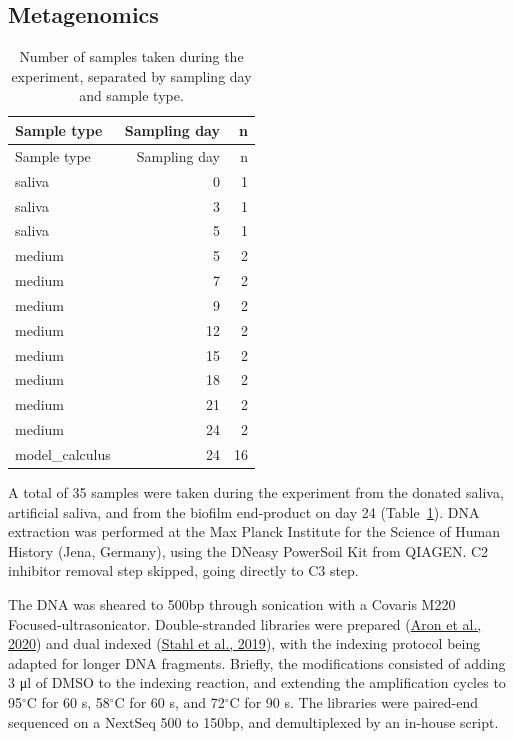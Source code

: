 \documentclass[
  letterpaper,
]{book}
\begin{document}
\hypertarget{metagenomics}{%
\subsection{Metagenomics}\label{metagenomics}}

\hypertarget{tbl-dna-samples}{}
\begin{longtable}[]{@{}lrr@{}}
\caption{\label{tbl-dna-samples}Number of samples taken during the
experiment, separated by sampling day and sample type.}\tabularnewline
\toprule\noalign{}
Sample type & Sampling day & n \\
\midrule\noalign{}
\endfirsthead
\toprule\noalign{}
Sample type & Sampling day & n \\
\midrule\noalign{}
\endhead
\bottomrule\noalign{}
\endlastfoot
saliva & 0 & 1 \\
saliva & 3 & 1 \\
saliva & 5 & 1 \\
medium & 5 & 2 \\
medium & 7 & 2 \\
medium & 9 & 2 \\
medium & 12 & 2 \\
medium & 15 & 2 \\
medium & 18 & 2 \\
medium & 21 & 2 \\
medium & 24 & 2 \\
model\_calculus & 24 & 16 \\
\end{longtable}

A total of 35 samples were taken during the experiment from the donated
saliva, artificial saliva, and from the biofilm end-product on day 24
(Table~\ref{tbl-dna-samples}). DNA extraction was performed at the Max
Planck Institute for the Science of Human History (Jena, Germany), using
the DNeasy PowerSoil Kit from QIAGEN. C2 inhibitor removal step skipped,
going directly to C3 step.

The DNA was sheared to 500bp through sonication with a Covaris M220
Focused-ultrasonicator. Double-stranded libraries were prepared
(\protect\hyperlink{ref-aronHalfUDG2020}{Aron et al., 2020}) and dual
indexed (\protect\hyperlink{ref-stahlDoublestrandedIndexing2019}{Stahl
et al., 2019}), with the indexing protocol being adapted for longer DNA
fragments. Briefly, the modifications consisted of adding 3 μl of DMSO
to the indexing reaction, and extending the amplification cycles to
95\(^{\circ}\)C for 60 s, 58\(^{\circ}\)C for 60 s, and 72\(^{\circ}\)C
for 90 s. The libraries were paired-end sequenced on a NextSeq 500 to
150bp, and demultiplexed by an in-house script.
\end{document}
